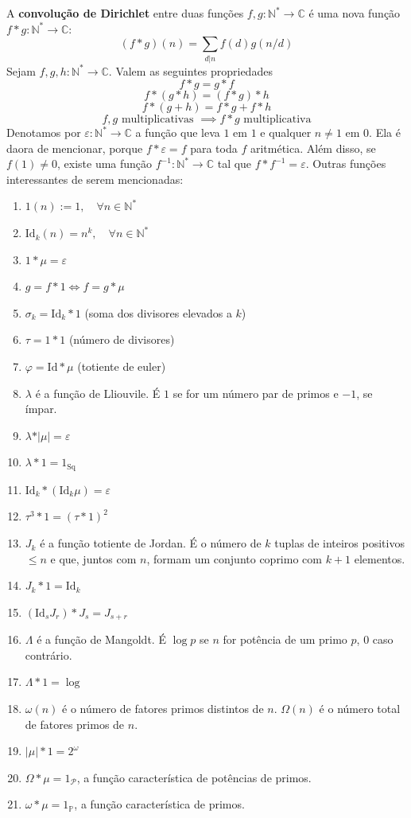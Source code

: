 A \textbf{convolução de Dirichlet} entre duas funções $f, g : \mathbb{N}^* \to \mathbb{C}$ é uma nova função 
$f * g : \mathbb{N}^* \to \mathbb{C}$:
$$ (f * g)(n) = \sum\limits_{d | n} f(d) g(n/d)$$
Sejam $f, g, h : \mathbb{N}^* \to \mathbb{C}$. Valem as seguintes propriedades
$$ f * g = g * f$$
$$ f * (g * h) = (f * g) * h$$
$$ f * (g + h) = f * g + f * h$$
$$ f, g \text{ multiplicativas } \implies f * g \text{ multiplicativa}$$
Denotamos por $\varepsilon : \mathbb{N}^* \to \mathbb{C}$ a função que leva $1$ em $1$ e qualquer $n \neq 1$ em $0$.
Ela é daora de mencionar, porque $f * \varepsilon = f$ para toda $f$ aritmética. Além disso, se $f(1) \neq 0$, existe
uma função $f^{-1} : \mathbb{N}^* \to \mathbb{C}$ tal que $f * f^{-1} = \varepsilon$.
Outras funções interessantes de serem mencionadas:
\begin{enumerate}
    \item $1(n) := 1, \quad \forall n \in \mathbb{N}^*$
    \item $\text{Id}_k(n) = n^k, \quad \forall n \in \mathbb{N}^*$
    \item $1 * \mu = \varepsilon$
    \item $g = f * 1 \Longleftrightarrow f = g * \mu$
    \item $\sigma_k = \text{Id}_k * 1$ (soma dos divisores elevados a $k$)
    \item $\tau = 1 * 1$ (número de divisores)
    \item $\varphi = \text{Id} * \mu$ (totiente de euler)
    \item $\lambda$ é a função de Lliouvile. É $1$ se for um número par de primos e $-1$, se ímpar.
    \item $\lambda * \vert \mu \vert = \varepsilon$
    \item $\lambda * 1 = 1_{\text{Sq}}$
    \item $\text{Id}_k * (\text{Id}_k \mu) = \varepsilon$
    \item $\tau^3 * 1 = (\tau * 1)^2$
    \item $J_k$ é a função totiente de Jordan. É o número de $k$ tuplas de inteiros positivos $\leq n$ e que, 
    juntos com $n$, formam um conjunto coprimo com $k+1$ elementos.
    \item $J_k * 1 = \text{Id}_k$
    \item $(\text{Id}_s J_r) * J_s = J_{s+r}$
    \item $\Lambda$ é a função de Mangoldt. É $\log p$ se $n$ for potência de um primo $p$, $0$ caso contrário.
    \item $\Lambda * 1 = \log$
    \item $\omega(n)$ é o número de fatores primos distintos de $n$. $\Omega(n)$ é o número total de fatores primos
    de $n$.
    \item $\vert \mu \vert * 1 = 2^\omega$
    \item $\Omega * \mu = 1_{\mathcal{P}}$, a função característica de potências de primos.
    \item $\omega * \mu = 1_{\mathbb{P}}$, a função característica de primos.
\end{enumerate}


